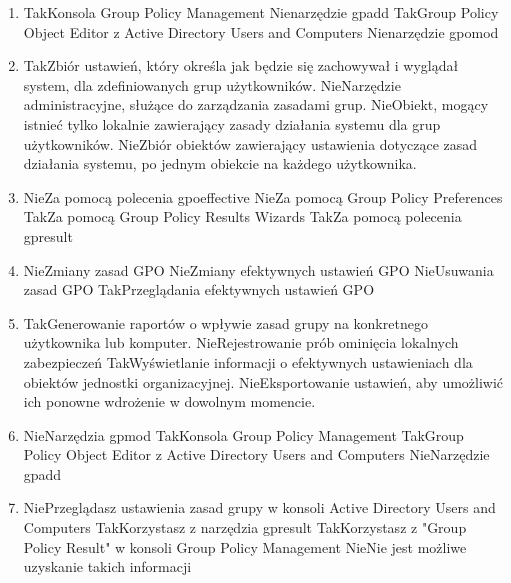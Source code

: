\begin{enumerate}
		\item {}%
		{Tak}{Konsola Group Policy Management}%
		{Nie}{narzędzie gpadd}%
		{Tak}{Group Policy Object Editor z Active Directory Users and Computers}%
		{Nie}{narzędzie gpomod}
		
		\item {}%
		{Tak}{Zbiór ustawień, który określa jak będzie się zachowywał i wyglądał system, dla zdefiniowanych grup użytkowników.}%
		{Nie}{Narzędzie administracyjne, służące do zarządzania zasadami grup.}%
		{Nie}{Obiekt, mogący istnieć tylko lokalnie zawierający zasady działania systemu dla grup użytkowników.}%
		{Nie}{Zbiór obiektów zawierający ustawienia dotyczące zasad działania systemu, po jednym obiekcie na każdego użytkownika.}
		
		\item {}%
		{Nie}{Za pomocą polecenia gpoeffective}%
		{Nie}{Za pomocą Group Policy Preferences}%
		{Tak}{Za pomocą Group Policy Results Wizards}%
		{Tak}{Za pomocą polecenia gpresult}
		
		\item {}%
		{Nie}{Zmiany zasad GPO}%
		{Nie}{Zmiany efektywnych ustawień GPO}%
		{Nie}{Usuwania zasad GPO}%
		{Tak}{Przeglądania efektywnych ustawień GPO}
		
		\item {}%
		{Tak}{Generowanie raportów o wpływie zasad grupy na konkretnego użytkownika lub komputer.}%
		{Nie}{Rejestrowanie prób ominięcia lokalnych zabezpieczeń}%
		{Tak}{Wyświetlanie informacji o efektywnych ustawieniach dla obiektów jednostki organizacyjnej.}%
		{Nie}{Eksportowanie ustawień, aby umożliwić ich ponowne wdrożenie w dowolnym momencie.}
		
		\item {}%
		{Nie}{Narzędzia gpmod}%
		{Tak}{Konsola Group Policy Management}%
		{Tak}{Group Policy Object Editor z Active Directory Users and Computers}%
		{Nie}{Narzędzie gpadd}
		
		\item {}%
		{Nie}{Przeglądasz ustawienia zasad grupy w konsoli Active Directory Users and Computers}%
		{Tak}{Korzystasz z narzędzia gpresult}%
		{Tak}{Korzystasz z  "Group Policy Result" w konsoli Group Policy Management}%
		{Nie}{Nie jest możliwe uzyskanie takich informacji}
		

\end{enumerate}
